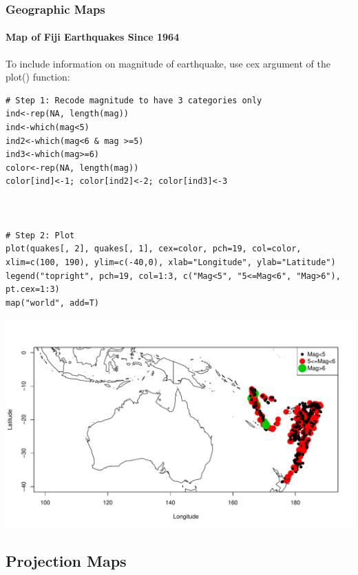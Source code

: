 \begin{frame}
\frametitle{Geographic Maps}
  \framesubtitle{Map of Fiji Earthquakes Since 1964}

To include information on magnitude of earthquake, use \ttfamily cex \normalfont argument of the \ttfamily plot() \normalfont function:
\begin{lstlisting}
# Step 1: Recode magnitude to have 3 categories only
ind<-rep(NA, length(mag))
ind<-which(mag<5)
ind2<-which(mag<6 & mag >=5)
ind3<-which(mag>=6)
color<-rep(NA, length(mag))
color[ind]<-1; color[ind2]<-2; color[ind3]<-3



# Step 2: Plot
plot(quakes[, 2], quakes[, 1], cex=color, pch=19, col=color, xlim=c(100, 190), ylim=c(-40,0), xlab="Longitude", ylab="Latitude")
legend("topright", pch=19, col=1:3, c("Mag<5", "5<=Mag<6", "Mag>6"), pt.cex=1:3)
map("world", add=T)
\end{lstlisting}

\newpage
       \begin{center}
		\includegraphics[scale=0.42]{images/fujiColor.pdf}
	\end{center}

\end{frame}


\subsection{Projection Maps}

